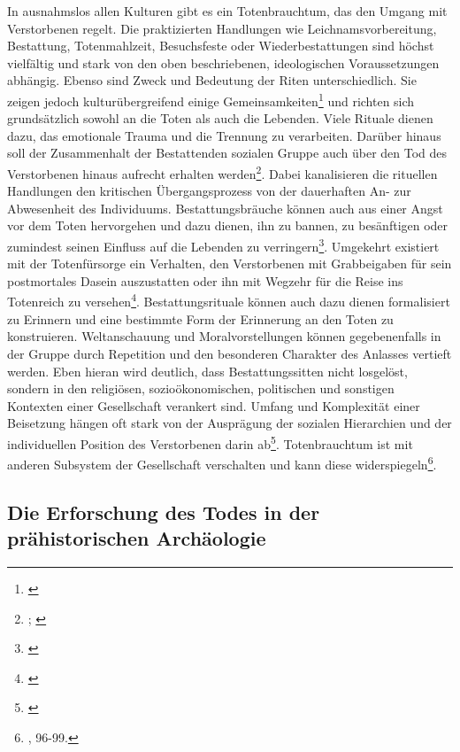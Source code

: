 \documentclass[openany,twoside,twocolumn]{book}
\let\rmarkdownfootnote\footnote%
\def\footnote{\protect\rmarkdownfootnote}
\begin{document}
In ausnahmslos allen Kulturen gibt es ein Totenbrauchtum, das den Umgang
mit Verstorbenen regelt. Die praktizierten Handlungen wie
Leichnamsvorbereitung, Bestattung, Totenmahlzeit, Besuchsfeste oder
Wiederbestattungen sind höchst vielfältig und stark von den oben
beschriebenen, ideologischen Voraussetzungen abhängig. Ebenso sind Zweck
und Bedeutung der Riten unterschiedlich. Sie zeigen jedoch
kulturübergreifend einige Gemeinsamkeiten\footnote{\textcite{macho_stichwort_1997}}
und richten sich grundsätzlich sowohl an die Toten als auch die
Lebenden. Viele Rituale dienen dazu, das emotionale Trauma und die
Trennung zu verarbeiten. Darüber hinaus soll der Zusammenhalt der
Bestattenden sozialen Gruppe auch über den Tod des Verstorbenen hinaus
aufrecht erhalten werden\footnote{\textcite{gladigow_naturae_1997};
  \textcite{hasenfratz_zum_1983}}. Dabei kanalisieren die rituellen
Handlungen den kritischen Übergangsprozess von der dauerhaften An- zur
Abwesenheit des Individuums. Bestattungsbräuche können auch aus einer
Angst vor dem Toten hervorgehen und dazu dienen, ihn zu bannen, zu
besänftigen oder zumindest seinen Einfluss auf die Lebenden zu
verringern\footnote{\textcite{lauf_im_1997}}. Umgekehrt existiert mit
der Totenfürsorge ein Verhalten, den Verstorbenen mit Grabbeigaben für
sein postmortales Dasein auszustatten oder ihn mit Wegzehr für die Reise
ins Totenreich zu versehen\footnote{\textcite{nebelsick_doppelte_1995}}.
Bestattungsrituale können auch dazu dienen formalisiert zu Erinnern und
eine bestimmte Form der Erinnerung an den Toten zu konstruieren.
Weltanschauung und Moralvorstellungen können gegebenenfalls in der
Gruppe durch Repetition und den besonderen Charakter des Anlasses
vertieft werden. Eben hieran wird deutlich, dass Bestattungssitten nicht
losgelöst, sondern in den religiösen, sozioökonomischen, politischen und
sonstigen Kontexten einer Gesellschaft verankert sind. Umfang und
Komplexität einer Beisetzung hängen oft stark von der Ausprägung der
sozialen Hierarchien und der individuellen Position des Verstorbenen
darin ab\footnote{\textcite{harke_final_1997}}. Totenbrauchtum ist mit
anderen Subsystem der Gesellschaft verschalten und kann diese
widerspiegeln\footnote{\textcite{hofmann_rituelle_2008}, 96-99.}.

\hypertarget{die-erforschung-des-todes-in-der-prahistorischen-archaologie}{%
\subsection{Die Erforschung des Todes in der prähistorischen
Archäologie}\label{die-erforschung-des-todes-in-der-prahistorischen-archaologie}}
\end{document}
